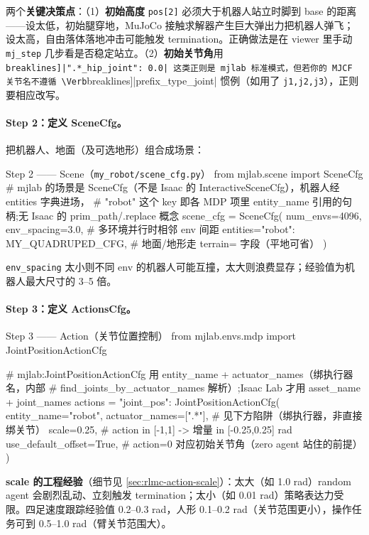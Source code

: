 两个\textbf{关键决策点}：（1）\textbf{初始高度} \verb|pos[2]| 必须大于机器人站立时脚到 base 的距离——设太低，初始腿穿地，MuJoCo 接触求解器产生巨大弹出力把机器人弹飞；设太高，自由落体落地冲击可能触发 termination。正确做法是在 viewer 里手动 \verb|mj_step| 几步看是否稳定站立。（2）\textbf{初始关节角}用 \Verb[breaklines]|".*_hip_joint": 0.0| 这类正则是 mjlab 标准模式，但若你的 MJCF 关节名不遵循 \Verb[breaklines]|prefix_type_joint| 惯例（如用了 \verb|j1,j2,j3|），正则要相应改写。

\paragraph{Step 2：定义 SceneCfg。}把机器人、地面（及可选地形）组合成场景：

\begin{codebox}[Python]{Step 2 —— Scene（\texttt{my\_robot/\allowbreak scene\_cfg.\allowbreak py}）}
from mjlab.scene import SceneCfg
# mjlab 的场景是 SceneCfg（不是 Isaac 的 InteractiveSceneCfg），机器人经 entities 字典进场，
# "robot" 这个 key 即各 MDP 项里 entity_name 引用的句柄;无 Isaac 的 prim_path/.replace 概念
scene_cfg = SceneCfg(
    num_envs=4096,
    env_spacing=3.0,                           # 多环境并行时相邻 env 间距
    entities={"robot": MY_QUADRUPED_CFG},      # 地面/地形走 terrain= 字段（平地可省）
)
\end{codebox}

\verb|env_spacing| 太小则不同 env 的机器人可能互撞，太大则浪费显存；经验值为机器人最大尺寸的 3--5 倍。

\paragraph{Step 3：定义 ActionsCfg。}

\begin{codebox}[Python]{Step 3 —— Action（关节位置控制）}
from mjlab.envs.mdp import JointPositionActionCfg

# mjlab:JointPositionActionCfg 用 entity_name + actuator_names（绑执行器名，内部
#   find_joints_by_actuator_names 解析）;Isaac Lab 才用 asset_name + joint_names
actions = {"joint_pos": JointPositionActionCfg(
    entity_name="robot",
    actuator_names=[".*"],       # 见下方陷阱（绑执行器，非直接绑关节）
    scale=0.25,                  # action in [-1,1] -> 增量 in [-0.25,0.25] rad
    use_default_offset=True,     # action=0 对应初始关节角（zero agent 站住的前提）
)}
\end{codebox}

\textbf{scale 的工程经验}（细节见 \cref{sec:rlmc-action-scale}）：太大（如 1.0 rad）random agent 会剧烈乱动、立刻触发 termination；太小（如 0.01 rad）策略表达力受限。四足速度跟踪经验值 0.2--0.3 rad，人形 0.1--0.2 rad（关节范围更小），操作任务可到 0.5--1.0 rad（臂关节范围大）。

